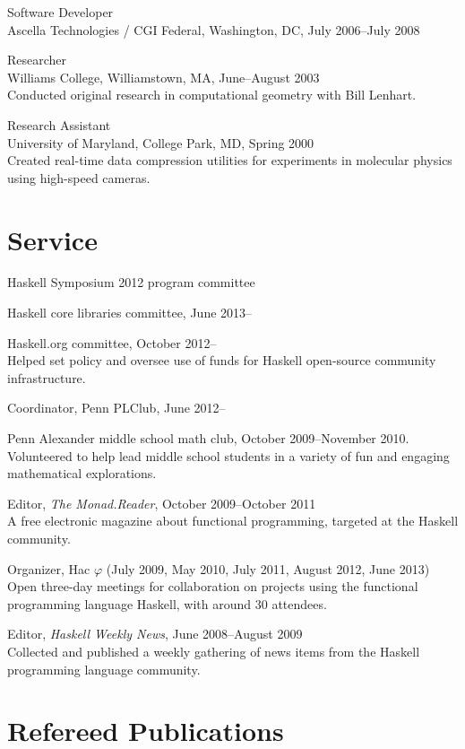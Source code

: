 \documentclass{article}
\newcommand{\cvitem}{\par\hangpara{2em}{1}}
\begin{document}
\cvitem
Software Developer \\
Ascella Technologies / CGI Federal, Washington,
DC, July 2006--July 2008

\cvitem
Researcher \\
Williams College, Williamstown, MA, June--August 2003 \\
Conducted original research in computational geometry with Bill Lenhart.

\cvitem
Research Assistant \\
University of Maryland, College Park, MD, Spring 2000 \\
Created real-time data compression utilities for experiments in
molecular physics using high-speed cameras.

\section*{Service}
\cvitem Haskell Symposium 2012 program committee

\cvitem Haskell core libraries committee, June 2013--

\cvitem Haskell.org committee, October 2012-- \\
Helped set policy and oversee use of funds for Haskell open-source
community infrastructure.

\cvitem Coordinator, Penn PLClub, June 2012--

\cvitem Penn Alexander middle school math club, October 2009--November
2010. \\
Volunteered to help lead middle school students in a variety of fun
and engaging mathematical explorations.

\cvitem Editor, \emph{The Monad.Reader}, October 2009--October 2011 \\
A free electronic magazine about functional programming, targeted at
the Haskell community.

\cvitem Organizer, Hac $\varphi$ (July 2009, May 2010, July 2011,
August 2012, June 2013) \\
Open three-day meetings for collaboration on projects using the functional
programming language Haskell, with around 30 attendees.

\cvitem Editor, \emph{Haskell Weekly News}, June 2008--August 2009 \\
Collected and published a weekly gathering of news items from the
Haskell programming language community.

\section*{Refereed Publications}
\end{document}
